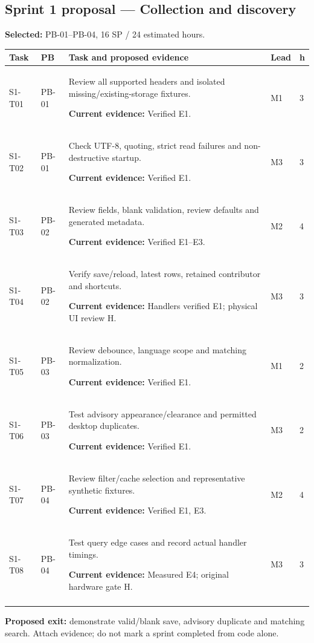 \documentclass[11pt,a4paper]{article}
\newcommand{\sprinttask}[6]{#1 & #2 & #3\par\smallskip\textbf{Current evidence:} #6 & #4 & #5\\\addlinespace}
\begin{document}
\subsection{Sprint 1 proposal --- Collection and discovery}
\textbf{Selected:} PB-01--PB-04, 16 SP / 24 estimated hours.
\begingroup\small
\begin{longtable}{L{1.3cm}L{1.2cm}L{8.2cm}L{1.1cm}L{0.8cm}}
\toprule\textbf{Task} & \textbf{PB} & \textbf{Task and proposed evidence} & \textbf{Lead} & \textbf{h}\\\midrule\endhead
\sprinttask{S1-T01}{PB-01}{Review all supported headers and isolated missing/existing-storage fixtures.}{M1}{3}{Verified E1.}
\sprinttask{S1-T02}{PB-01}{Check UTF-8, quoting, strict read failures and non-destructive startup.}{M3}{3}{Verified E1.}
\sprinttask{S1-T03}{PB-02}{Review fields, blank validation, review defaults and generated metadata.}{M2}{4}{Verified E1--E3.}
\sprinttask{S1-T04}{PB-02}{Verify save/reload, latest rows, retained contributor and shortcuts.}{M3}{3}{Handlers verified E1; physical UI review H.}
\sprinttask{S1-T05}{PB-03}{Review debounce, language scope and matching normalization.}{M1}{2}{Verified E1.}
\sprinttask{S1-T06}{PB-03}{Test advisory appearance/clearance and permitted desktop duplicates.}{M3}{2}{Verified E1.}
\sprinttask{S1-T07}{PB-04}{Review filter/cache selection and representative synthetic fixtures.}{M2}{4}{Verified E1, E3.}
\sprinttask{S1-T08}{PB-04}{Test query edge cases and record actual handler timings.}{M3}{3}{Measured E4; original hardware gate H.}
\bottomrule\end{longtable}\endgroup
\textbf{Proposed exit:} demonstrate valid/blank save, advisory duplicate and
matching search. Attach evidence; do not mark a sprint completed from code alone.
\end{document}
